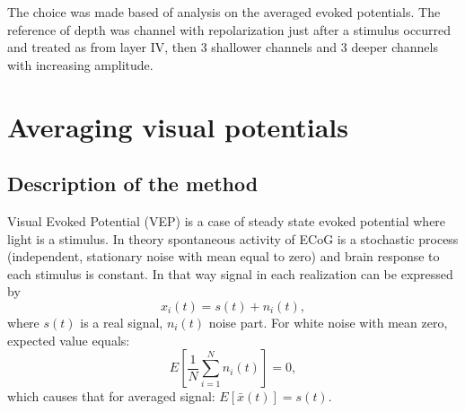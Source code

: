 \documentclass{pracalicmgr}
\begin{document}
    The choice was made based of analysis on the averaged evoked potentials. The reference of depth was channel with repolarization just after a stimulus occurred and treated as from layer IV, then 3 shallower channels and 3 deeper channels with increasing amplitude. 
    
    
    \section{Averaging visual potentials}
    
    \subsection{Description of the method}
    Visual Evoked Potential (VEP) is a case of steady state evoked potential where light is a stimulus. In theory spontaneous activity of ECoG is a stochastic process (independent, stationary noise with mean equal to zero) and brain response to each stimulus is constant. 
    \newpage
    In that way signal in each realization can be expressed by  
    \begin{equation}
    x_i(t) = s(t) + n_i(t),
    \end{equation}
    where $s(t)$ is a real signal, $n_i(t)$ noise part. For white noise with mean zero, expected value equals:
    \begin{equation}
    E\left[ \frac{1}{N}\sum_{i=1}^{N} n_i(t)\right] = 0, 
    \end{equation}
    which causes that for averaged signal: $E\left[ \bar{x}(t) \right] = s(t).$
    
\end{document}
